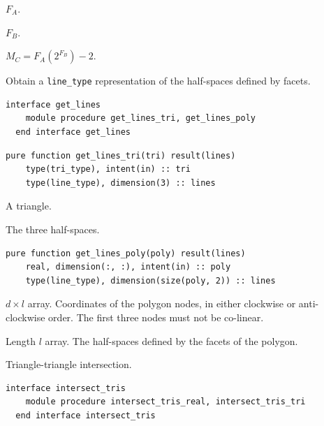 \documentclass{article}
\begin{document}
\begin{description}[font=\ttfamily\bfseries,leftmargin=2.2\parindent,labelindent=1.7\parindent,noitemsep]
  \item[n\_lines\_a] $F_A$.
  \item[n\_lines\_b] $F_B$.
  \item[max\_n\_tris\_c] $M_C = F_A \left( 2^{F_B} \right) - 2$.
\end{description}

\noindent Obtain a \verb+line_type+ representation of the half-spaces defined by
facets.

\begin{lstlisting}[language=FORTRAN]
  interface get_lines
    module procedure get_lines_tri, get_lines_poly
  end interface get_lines
\end{lstlisting} 

\begin{lstlisting}[language=FORTRAN]
  pure function get_lines_tri(tri) result(lines)
    type(tri_type), intent(in) :: tri
    type(line_type), dimension(3) :: lines
\end{lstlisting}

\begin{description}[font=\ttfamily\bfseries,leftmargin=2.2\parindent,labelindent=1.7\parindent,noitemsep]
  \item[tri] A triangle.
  \item[lines] The three half-spaces.
\end{description}

\begin{lstlisting}[language=FORTRAN]
  pure function get_lines_poly(poly) result(lines)
    real, dimension(:, :), intent(in) :: poly    
    type(line_type), dimension(size(poly, 2)) :: lines
\end{lstlisting}

\begin{description}[font=\ttfamily\bfseries,leftmargin=2.2\parindent,labelindent=1.7\parindent,noitemsep]
  \item[poly] $d \times l$ array. Coordinates of the polygon nodes, in either
    clockwise or anti-clockwise order. The first three nodes must not be
    co-linear.
  \item[lines] Length $l$ array. The half-spaces defined by the facets of the
    polygon.
\end{description}

\noindent Triangle-triangle intersection.

\begin{lstlisting}[language=FORTRAN]
  interface intersect_tris
    module procedure intersect_tris_real, intersect_tris_tri
  end interface intersect_tris
\end{lstlisting}
\end{document}
